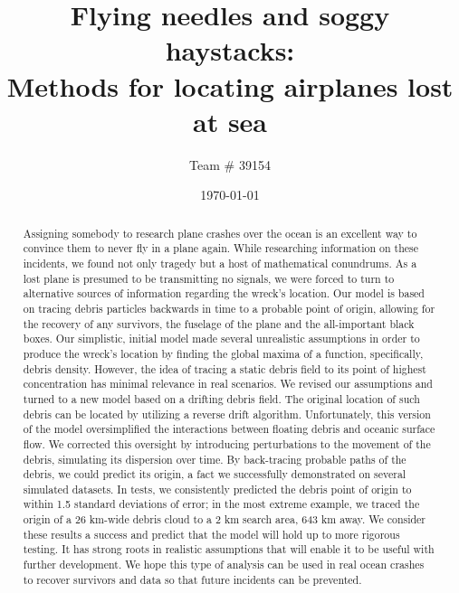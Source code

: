 \documentclass[pre,12pt]{revtex4-1}
\begin{document}
\title{Flying needles and soggy haystacks: \\\textbf{Methods for locating airplanes lost at sea}}
\author{Team \# 39154}
\date{\today}

\begin{abstract}
Assigning somebody to research plane crashes over the ocean is an excellent way to convince them to never fly in a plane again. While researching information on these incidents, we found not only tragedy but a host of mathematical conundrums. As a lost plane is presumed to be transmitting no signals, we were forced to turn to alternative sources of information regarding the wreck's location. Our model is based on tracing debris particles backwards in time to a probable point of origin, allowing for the recovery of any survivors, the fuselage of the plane and the all-important black boxes.
Our simplistic, initial model made several unrealistic assumptions in order to produce the wreck's location by finding the global maxima of a function, specifically, debris density. However, the idea of tracing a static debris field to its point of highest concentration has minimal relevance in real scenarios. We revised our assumptions and turned to a new model based on a drifting debris field. The original location of such debris can be located by utilizing a reverse drift algorithm. Unfortunately, this version of the model oversimplified the interactions between floating debris and oceanic surface flow. We corrected this oversight by introducing perturbations to the movement of the debris, simulating its dispersion over time. By back-tracing probable paths of the debris, we could predict its origin, a fact we successfully demonstrated on several simulated datasets. 
In tests, we consistently predicted the debris point of origin to within 1.5 standard deviations of error; in the most extreme example, we traced the origin of a 26 km-wide debris cloud to a 2 km search area, 643 km away. We consider these results a success and predict that the model will hold up to more rigorous testing. It has strong roots in realistic assumptions that will enable it to be useful with further development. We hope this type of analysis can be used in real ocean crashes to recover survivors and data so that future incidents can be prevented.
\end{abstract}
\maketitle

\newpage
\end{document}
